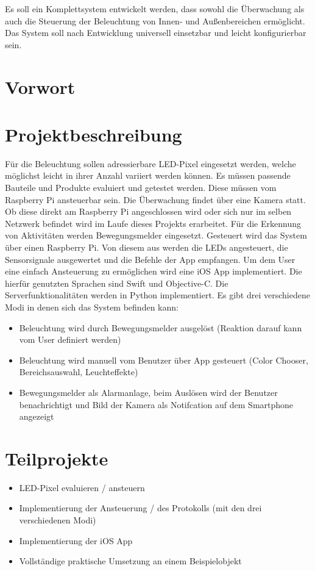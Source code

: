 
Es soll ein Komplettsystem entwickelt werden, dass sowohl die Überwachung als auch die Steuerung der Beleuchtung von Innen- und Außenbereichen ermöglicht. Das System soll nach Entwicklung universell einsetzbar und leicht konfigurierbar sein. 
\section{Vorwort}
\section{Projektbeschreibung}
Für die Beleuchtung sollen adressierbare LED-Pixel eingesetzt werden, welche möglichst leicht in ihrer Anzahl variiert werden können. Es müssen passende Bauteile und Produkte evaluiert und getestet werden. Diese müssen vom Raspberry Pi ansteuerbar sein.
Die Überwachung findet über eine Kamera statt. Ob diese direkt am Raspberry Pi angeschlossen wird oder sich nur im selben Netzwerk befindet wird im Laufe dieses Projekts erarbeitet. Für die Erkennung von Aktivitäten werden Bewegungsmelder eingesetzt. 
Gesteuert wird das System über einen Raspberry Pi. Von diesem aus werden die LEDs angesteuert, die Sensorsignale ausgewertet und die Befehle der App empfangen.
Um dem User eine einfach Ansteuerung zu ermöglichen wird eine iOS App implementiert. Die hierfür genutzten Sprachen sind Swift und Objective-C. Die Serverfunktionalitäten werden in Python implementiert.
Es gibt drei verschiedene Modi in denen sich das System befinden kann:
\begin{itemize}
\item Beleuchtung wird durch Bewegungsmelder ausgelöst (Reaktion darauf kann vom User definiert werden)
\item Beleuchtung wird manuell vom Benutzer über App gesteuert (Color Chooser, Bereichsauswahl, Leuchteffekte)
\item Bewegungsmelder als Alarmanlage, beim Auslösen wird der Benutzer benachrichtigt und Bild der Kamera als Notifcation auf dem Smartphone angezeigt
\end{itemize}

\section{Teilprojekte}
\begin{itemize}
\item LED-Pixel evaluieren / ansteuern
\item Implementierung der Ansteuerung / des Protokolls (mit den drei verschiedenen Modi)
\item Implementierung der iOS App
\item Vollständige praktische Umsetzung an einem Beispielobjekt
\end{itemize}
